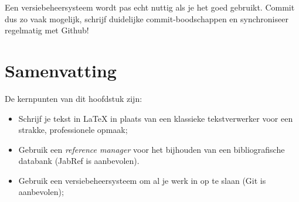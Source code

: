 Een versiebeheersysteem wordt pas echt nuttig als je het goed gebruikt. Commit dus zo vaak mogelijk, schrijf duidelijke commit-boodschappen en synchroniseer regelmatig met Github!

\section{Samenvatting}
\label{sec:voorbereiding-samenvatting}

De kernpunten van dit hoofdstuk zijn:

\begin{itemize}
  \item Schrijf je tekst in {\LaTeX} in plaats van een klassieke tekstverwerker voor een strakke, professionele opmaak;
  \item Gebruik een \emph{reference manager} voor het bijhouden van een bibliografische databank (JabRef is aanbevolen).
  \item Gebruik een versiebeheersysteem om al je werk in op te slaan (Git is aanbevolen);
\end{itemize}
